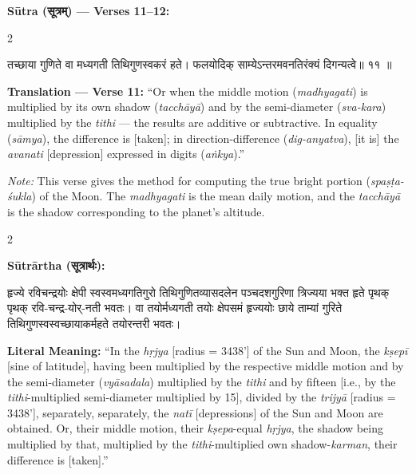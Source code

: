 \documentclass[11pt,a4paper]{article}
\newcommand{\dev}[1]{{\devanagarifont #1}}
\newenvironment{sanskritverse}{%
  \begin{center}\begin{minipage}{0.95\textwidth}
  \setlength{\leftskip}{1em}
  \setlength{\rightskip}{1em}
  \dev
}{\end{minipage}\end{center}}
\begin{document}
\vspace{0.5em}
\noindent\textbf{Sūtra ({\devanagarifont सूत्रम्}) — Verses 11--12:}

\begin{paracol}{2}

\begin{sanskritverse}
तच्छाया गुणिते वा मध्यगती तिथिगुणस्वकरं हते।
फलयोदिक् साम्येऽन्तरमवनतिरंक्यं दिगन्यत्वे॥ ११ ॥
\end{sanskritverse}

\switchcolumn

\textbf{Translation — Verse 11:} ``Or when the middle motion (\textit{madhyagati}) is multiplied by its own shadow (\textit{tacchāyā}) and by the semi-diameter (\textit{sva-kara}) multiplied by the \textit{tithi} --- the results are additive or subtractive. In equality (\textit{sāmya}), the difference is [taken]; in direction-difference (\textit{dig-anyatva}), [it is] the \textit{avanati} [depression] expressed in digits (\textit{aṅkya}).''

\textit{Note:} This verse gives the method for computing the true bright portion (\textit{spaṣṭa-śukla}) of the Moon. The \textit{madhyagati} is the mean daily motion, and the \textit{tacchāyā} is the shadow corresponding to the planet's altitude.

\end{paracol}

\vspace{0.5em}

\begin{paracol}{2}

\noindent\textbf{Sūtrārtha (\dev{सूत्रार्थः}):}
\begin{sanskritverse}
हृज्ये रविचन्द्रयोः क्षेपी स्वस्वमध्यगतिगुरो तिथिगुणितव्यासदलेन पञ्चदशगुरिणा
त्रिज्यया भक्त हृते पृथक् पृथक् रवि-चन्द्र-योर्-नती भवतः। वा तयोर्मध्यगती
तयोः क्षेपसमं हृज्ययोः छाये ताम्यां गुरिते तिथिगुणस्वस्वच्छायाकर्महते तयोरन्तरी भवतः।
\end{sanskritverse}

\switchcolumn

\textbf{Literal Meaning:} ``In the \textit{hṛjya} [radius = 3438'] of the Sun and Moon, the \textit{kṣepī} [sine of latitude], having been multiplied by the respective middle motion and by the semi-diameter (\textit{vyāsadala}) multiplied by the \textit{tithi} and by fifteen [i.e., by the \textit{tithi}-multiplied semi-diameter multiplied by 15], divided by the \textit{trijyā} [radius = 3438'], separately, separately, the \textit{natī} [depressions] of the Sun and Moon are obtained. Or, their middle motion, their \textit{kṣepa}-equal \textit{hṛjya}, the shadow being multiplied by that, multiplied by the \textit{tithi}-multiplied own shadow-\textit{karman}, their difference is [taken].''

\end{paracol}
\end{document}
